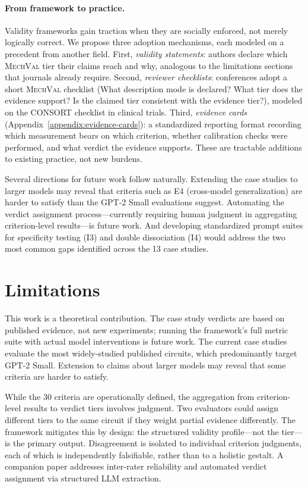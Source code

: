 \documentclass{article}
\newcommand{\mechval}{\textsc{MechVal}}
\begin{document}
\paragraph{From framework to practice.}
Validity frameworks gain traction when they are socially enforced, not merely logically correct. We propose three adoption mechanisms, each modeled on a precedent from another field. First, \emph{validity statements}: authors declare which \mechval{} tier their claims reach and why, analogous to the limitations sections that journals already require. Second, \emph{reviewer checklists}: conferences adopt a short \mechval{} checklist (What description mode is declared? What tier does the evidence support? Is the claimed tier consistent with the evidence tier?), modeled on the CONSORT checklist in clinical trials. Third, \emph{evidence cards} (Appendix~\ref{appendix:evidence-cards}): a standardized reporting format recording which measurement bears on which criterion, whether calibration checks were performed, and what verdict the evidence supports. These are tractable additions to existing practice, not new burdens.

Several directions for future work follow naturally. Extending the case studies to larger models may reveal that criteria such as E4 (cross-model generalization) are harder to satisfy than the GPT-2 Small evaluations suggest. Automating the verdict assignment process---currently requiring human judgment in aggregating criterion-level results---is future work. And developing standardized prompt suites for specificity testing (I3) and double dissociation (I4) would address the two most common gaps identified across the 13 case studies.

\section{Limitations}
\label{sec:limitations}

This work is a theoretical contribution. The case study verdicts are based on published evidence, not new experiments; running the framework's full metric suite with actual model interventions is future work. The current case studies evaluate the most widely-studied published circuits, which predominantly target GPT-2 Small. Extension to claims about larger models may reveal that some criteria are harder to satisfy.

While the 30 criteria are operationally defined, the aggregation from criterion-level results to verdict tiers involves judgment. Two evaluators could assign different tiers to the same circuit if they weight partial evidence differently. The framework mitigates this by design: the structured validity profile---not the tier---is the primary output. Disagreement is isolated to individual criterion judgments, each of which is independently falsifiable, rather than to a holistic gestalt. A companion paper addresses inter-rater reliability and automated verdict assignment via structured LLM extraction.
\end{document}

